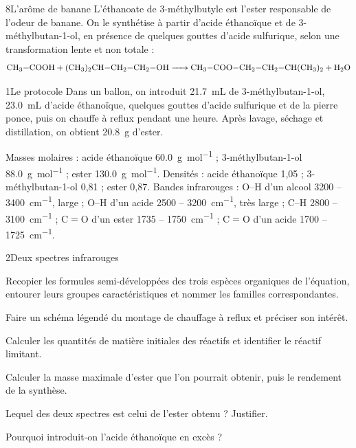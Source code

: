 

\begin{exoBac}{8}{L'arôme de banane}
L'éthanoate de 3-méthylbutyle est l'ester responsable de l'odeur de banane. On le synthétise à partir d'acide éthanoïque et de
3-méthylbutan-1-ol, en présence de quelques gouttes d'acide sulfurique, selon une transformation lente et non totale :
\[\ce{CH3-COOH + (CH3)2CH-CH2-CH2-OH -> CH3-COO-CH2-CH2-CH(CH3)2 + H2O}\]
\begin{docu}{1}{Le protocole}
Dans un ballon, on introduit \qty{21,7}{mL} de 3-méthylbutan-1-ol, \qty{23,0}{mL} d'acide éthanoïque, quelques gouttes d'acide sulfurique et
de la pierre ponce, puis on chauffe à reflux pendant une heure. Après lavage, séchage et distillation, on obtient \qty{20,8}{g} d'ester.
\end{docu}
\begin{donnees}
Masses molaires : acide éthanoïque \qty{60,0}{g.mol^{-1}} ; 3-méthylbutan-1-ol \qty{88,0}{g.mol^{-1}} ; ester \qty{130,0}{g.mol^{-1}}. Densités :
acide éthanoïque 1,05 ; 3-méthylbutan-1-ol 0,81 ; ester 0,87. Bandes infrarouges : O--H d'un alcool 3200 -- \qty{3400}{cm^{-1}}, large ; O--H d'un acide 2500 -- \qty{3200}{cm^{-1}}, très large ;
C--H 2800 -- \qty{3100}{cm^{-1}} ; C$=$O d'un ester 1735 -- \qty{1750}{cm^{-1}} ; C$=$O d'un acide 1700 -- \qty{1725}{cm^{-1}}.
\end{donnees}
\begin{docu}{2}{Deux spectres infrarouges}
\end{docu}
\begin{questions}
\item Recopier les formules semi-développées des trois espèces organiques de l'équation, entourer leurs groupes caractéristiques
et nommer les familles correspondantes.
\item Faire un schéma légendé du montage de chauffage à reflux et préciser son intérêt.
\item Calculer les quantités de matière initiales des réactifs et identifier le réactif limitant.
\item Calculer la masse maximale d'ester que l'on pourrait obtenir, puis le rendement de la synthèse.
\item Lequel des deux spectres est celui de l'ester obtenu ? Justifier.
\item Pourquoi introduit-on l'acide éthanoïque en excès ?
\end{questions}
\end{exoBac}

